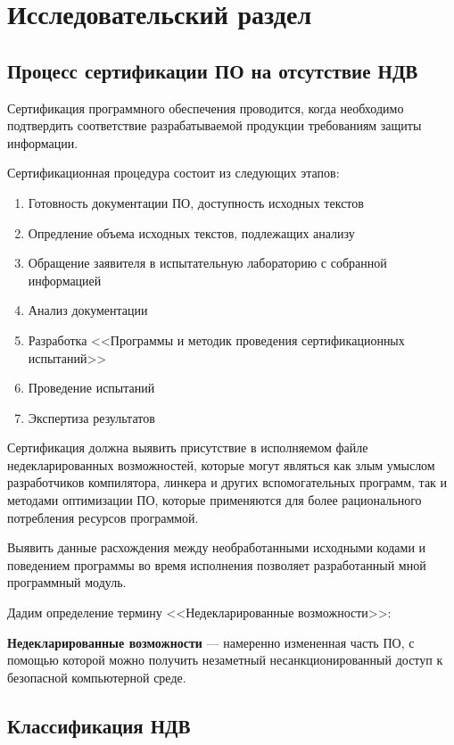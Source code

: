 \chapter{Исследовательский раздел}\label{ch:ch1}
\section{Процесс сертификации ПО на отсутствие НДВ}\label{sec:ch1/sec1}
Сертификация программного обеспечения проводится, 
когда необходимо подтвердить соответствие разрабатываемой 
продукции требованиям защиты информации.

Сертификационная процедура состоит из следующих этапов:
\begin{enumerate}
    \item Готовность документации ПО, доступность исходных текстов
    \item Опредление объема исходных текстов, подлежащих анализу
    \item Обращение заявителя в испытательную лабораторию с собранной информацией
    \item Анализ документации
    \item Разработка <<Программы и методик проведения сертификационных испытаний>>
    \item Проведение испытаний
    \item Экспертиза результатов
\end{enumerate}

Сертификация должна выявить присутствие в исполняемом файле недекларированных возможностей,
которые могут являться как злым умыслом\autocite{compile-a-virus, ken-thompson-hack} 
разработчиков компилятора, линкера и других вспомогательных программ,
так и методами оптимизации ПО, которые применяются для более рационального 
потребления ресурсов программой.

Выявить данные расхождения между необработанными исходными кодами и 
поведением программы во время исполнения позволяет разработанный мной
программный модуль.

Дадим определение термину <<Недекларированные возможности>>:

\textbf{Недекларированные возможности}\autocite{undeclared-capabilities-antimalware} 
— намеренно измененная часть ПО, с помощью которой можно получить незаметный 
несанкционированный доступ к безопасной компьютерной среде.

\section{Классификация НДВ}\label{sec:ch1/sec2}
